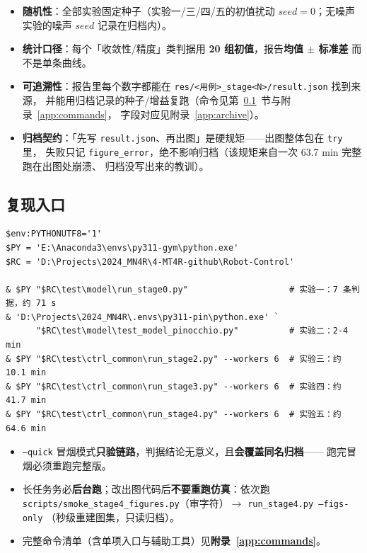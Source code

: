 \documentclass[11pt,a4paper]{ctexart}
\begin{document}
\begin{itemize}[leftmargin=1.6em,itemsep=2pt]
\item \textbf{随机性}：全部实验固定种子（实验一/三/四/五的初值扰动 $seed=0$；无噪声实验的噪声 $seed$
  记录在归档内）。
\item \textbf{统计口径}：每个「收敛性/精度」类判据用 \textbf{20 组初值}，报告\textbf{均值 $\pm$ 标准差}
  而不是单条曲线。
\item \textbf{可追溯性}：报告里每个数字都能在 \texttt{res/<用例>\_stage<N>/result.json} 找到来源，
  并能用归档记录的种子/增益复跑（命令见第~\ref{sec:repro}~节与附录~\ref{app:commands}，
  字段对应见附录~\ref{app:archive}）。
\item \textbf{归档契约}：「先写 \texttt{result.json}、再出图」是硬规矩——出图整体包在 \texttt{try} 里，
  失败只记 \texttt{figure\_error}，绝不影响归档（该规矩来自一次 63.7 min 完整跑在出图处崩溃、
  归档没写出来的教训）。
\end{itemize}

\subsection{复现入口}\label{sec:repro}

{\footnotesize
\begin{verbatim}
$env:PYTHONUTF8='1'
$PY = 'E:\Anaconda3\envs\py311-gym\python.exe'
$RC = 'D:\Projects\2024_MN4R\4-MT4R-github\Robot-Control'

& $PY "$RC\test\model\run_stage0.py"                    # 实验一：7 条判据，约 71 s
& 'D:\Projects\2024_MN4R\.envs\py311-pin\python.exe' `
      "$RC\test\model\test_model_pinocchio.py"          # 实验二：2-4 min
& $PY "$RC\test\ctrl_common\run_stage2.py" --workers 6  # 实验三：约 10.1 min
& $PY "$RC\test\ctrl_common\run_stage3.py" --workers 6  # 实验四：约 41.7 min
& $PY "$RC\test\ctrl_common\run_stage4.py" --workers 6  # 实验五：约 64.6 min
\end{verbatim}
}

\begin{itemize}[leftmargin=1.6em,itemsep=2pt]
\item \texttt{--quick} 冒烟模式\textbf{只验链路}，判据结论无意义，且\textbf{会覆盖同名归档}——
  跑完冒烟必须重跑完整版。
\item 长任务务必\textbf{后台跑}；改出图代码后\textbf{不要重跑仿真}：依次跑
  \texttt{scripts/smoke\_stage4\_figures.py}（审字符）$\to$ \texttt{run\_stage4.py --figs-only}
  （秒级重建图集，只读归档）。
\item 完整命令清单（含单项入口与辅助工具）见\textbf{附录~\ref{app:commands}}。
\end{itemize}
\end{document}
